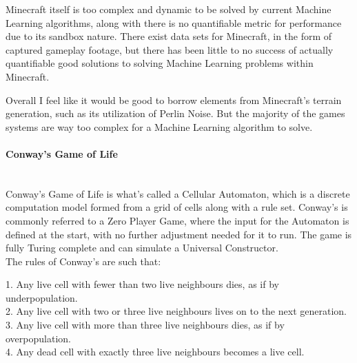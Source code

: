 \begin{flushleft}
                    Minecraft itself is too complex and dynamic to be solved by current Machine Learning algorithms, along with there is no quantifiable 
                    metric for performance due to its sandbox nature. There exist data sets for Minecraft, in the form of captured gameplay footage, but
                    there has been little to no success of actually quantifiable good solutions to solving Machine Learning problems within Minecraft. \\

                    \vspace{0.2cm}

                    Overall I feel like it would be good to borrow elements from Minecraft's terrain generation, such as its utilization of Perlin Noise.
                    But the majority of the games systems are way too complex for a Machine Learning algorithm to solve. \\

                \paragraph{Conway's Game of Life} \mbox{} \\
                    \vspace{0.2cm}
                    Conway's Game of Life is what's called a Cellular Automaton, which is a discrete computation model formed from a grid of cells along with 
                    a rule set. Conway's is commonly referred to a Zero Player Game, where the input for the Automaton is defined at the start, with no
                    further adjustment needed for it to run. The game is fully Turing complete and can simulate a Universal Constructor. \\
                    \vspace{0.2cm}
                    The rules of Conway's are such that: \\

                    \vspace{0.2cm}
                    \begin{addmargin}[2em]{0em}
                        \large
                        1. Any live cell with fewer than two live neighbours dies, as if by underpopulation. \\
                        2. Any live cell with two or three live neighbours lives on to the next generation. \\
                        3. Any live cell with more than three live neighbours dies, as if by overpopulation. \\
                        4. Any dead cell with exactly three live neighbours becomes a live cell. \\
                    \end{addmargin}


\end{flushleft}
